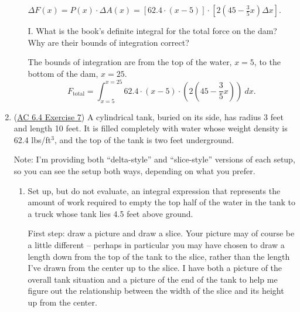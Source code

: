 \documentclass[10pt]{article}
\newenvironment{red}{\color{red}}{\ignorespacesafterend}
\begin{document}
\begin{enumerate}[leftmargin=0pt]
\begin{enumerate}
    \begin{red}
        $\Delta F(x) = P(x)\cdot \Delta A(x) = [62.4\cdot (x-5)]\cdot\left[2\left(45 - \tfrac35 x\right)\Delta x\right]. $
    \end{red}
    \item[I.] What is the book's definite integral for the total force on the dam? Why are their bounds of integration correct?

    \begin{red}
        The bounds of integration are from the top of the water, $x=5$, to the bottom of the dam, $x=25$.
        \[F_\text{total} = \displaystyle\int_{x=5}^{x=25} 62.4\cdot(x-5)\cdot\left(2\left(45 - \dfrac35 x\right)\right)\ dx. \]
    \end{red}
\end{enumerate}

\item (\href{https://activecalculus.org/single/sec-6-4-physics.html#wrN}{AC 6.4 Exercise 7}) A cylindrical tank, buried on its side, has radius 3 feet and length 10 feet. It is filled completely with water whose weight density is 62.4 lbs/ft$^3$, and the top of the tank is two feet underground.

\begin{red}
    Note: I'm providing both ``delta-style'' and ``slice-style'' versions of each setup, so you can see the setup both ways, depending on what you prefer.
\end{red}

\begin{enumerate}
    \item Set up, but do not evaluate, an integral expression that represents the amount of work required to empty the top half of the water in the tank to a truck whose tank lies 4.5 feet above ground.
    
    \begin{red}
    First step: draw a picture and draw a slice. Your picture may of course be a little different -- perhaps in particular you may have chosen to draw a length down from the top of the tank to the slice, rather than the length I've drawn from the center up to the slice. I have both a picture of the overall tank situation and a picture of the end of the tank to help me figure out the relationship between the width of the slice and its height up from the center.
    

\end{red}
\end{enumerate}
\end{enumerate}
\end{document}
